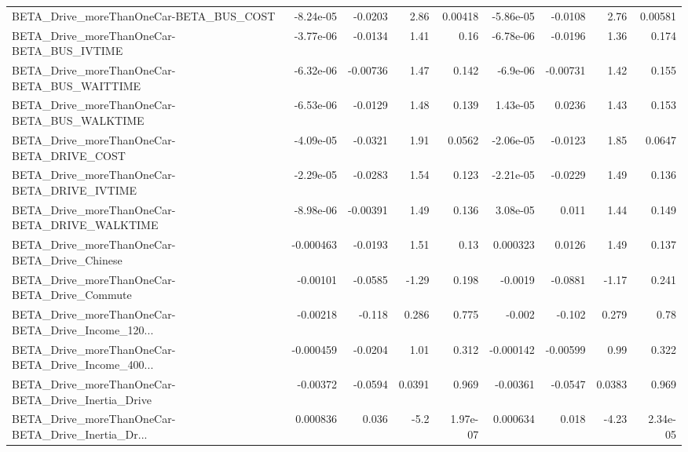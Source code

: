 \begin{tabular}{lrrrrrrrr}
BETA\_Drive\_moreThanOneCar-BETA\_BUS\_COST            &   -8.24e-05 &      -0.0203 &     2.86 &  0.00418 &  -5.86e-05 &     -0.0108 &         2.76 &       0.00581 \\
BETA\_Drive\_moreThanOneCar-BETA\_BUS\_IVTIME          &   -3.77e-06 &      -0.0134 &     1.41 &     0.16 &  -6.78e-06 &     -0.0196 &         1.36 &         0.174 \\
BETA\_Drive\_moreThanOneCar-BETA\_BUS\_WAITTIME        &   -6.32e-06 &     -0.00736 &     1.47 &    0.142 &   -6.9e-06 &    -0.00731 &         1.42 &         0.155 \\
BETA\_Drive\_moreThanOneCar-BETA\_BUS\_WALKTIME        &   -6.53e-06 &      -0.0129 &     1.48 &    0.139 &   1.43e-05 &      0.0236 &         1.43 &         0.153 \\
BETA\_Drive\_moreThanOneCar-BETA\_DRIVE\_COST          &   -4.09e-05 &      -0.0321 &     1.91 &   0.0562 &  -2.06e-05 &     -0.0123 &         1.85 &        0.0647 \\
BETA\_Drive\_moreThanOneCar-BETA\_DRIVE\_IVTIME        &   -2.29e-05 &      -0.0283 &     1.54 &    0.123 &  -2.21e-05 &     -0.0229 &         1.49 &         0.136 \\
BETA\_Drive\_moreThanOneCar-BETA\_DRIVE\_WALKTIME      &   -8.98e-06 &     -0.00391 &     1.49 &    0.136 &   3.08e-05 &       0.011 &         1.44 &         0.149 \\
BETA\_Drive\_moreThanOneCar-BETA\_Drive\_Chinese       &   -0.000463 &      -0.0193 &     1.51 &     0.13 &   0.000323 &      0.0126 &         1.49 &         0.137 \\
BETA\_Drive\_moreThanOneCar-BETA\_Drive\_Commute       &    -0.00101 &      -0.0585 &    -1.29 &    0.198 &    -0.0019 &     -0.0881 &        -1.17 &         0.241 \\
BETA\_Drive\_moreThanOneCar-BETA\_Drive\_Income\_120... &    -0.00218 &       -0.118 &    0.286 &    0.775 &     -0.002 &      -0.102 &        0.279 &          0.78 \\
BETA\_Drive\_moreThanOneCar-BETA\_Drive\_Income\_400... &   -0.000459 &      -0.0204 &     1.01 &    0.312 &  -0.000142 &    -0.00599 &         0.99 &         0.322 \\
BETA\_Drive\_moreThanOneCar-BETA\_Drive\_Inertia\_Drive &    -0.00372 &      -0.0594 &   0.0391 &    0.969 &   -0.00361 &     -0.0547 &       0.0383 &         0.969 \\
BETA\_Drive\_moreThanOneCar-BETA\_Drive\_Inertia\_Dr... &    0.000836 &        0.036 &     -5.2 & 1.97e-07 &   0.000634 &       0.018 &        -4.23 &      2.34e-05 \\

\end{tabular}
